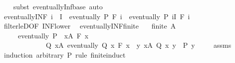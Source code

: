 \begin{isabellebody}
%
\isadelimproof
\ \ %
\endisadelimproof
%
\isatagproof
{}\isamarkupfalse%
\ {\isacharparenleft}{\kern0pt}subst\ eventually{\isacharunderscore}{\kern0pt}Inf{\isacharunderscore}{\kern0pt}base{\isacharparenright}{\kern0pt}\ auto%
\endisatagproof
{\isafoldproof}%
%
\isadelimproof
\isanewline
%
\endisadelimproof
\isanewline
{}\isamarkupfalse%
\ eventually{\isacharunderscore}{\kern0pt}INF{}{\isacharcolon}{\kern0pt}\ {\isachardoublequoteopen}i\ {\isasymin}\ I\ {\isasymLongrightarrow}\ eventually\ P\ {\isacharparenleft}{\kern0pt}F\ i{\isacharparenright}{\kern0pt}\ {\isasymLongrightarrow}\ eventually\ P\ {\isacharparenleft}{\kern0pt}{\isasymSqinter}i{\isasymin}I{\isachardot}{\kern0pt}\ F\ i{\isacharparenright}{\kern0pt}{\isachardoublequoteclose}\isanewline
%
\isadelimproof
\ \ %
\endisadelimproof
%
\isatagproof
{}\isamarkupfalse%
\ filter{\isacharunderscore}{\kern0pt}leD{\isacharbrackleft}{\kern0pt}OF\ INF{\isacharunderscore}{\kern0pt}lower{\isacharbrackright}{\kern0pt}\ \isacommand{{\isachardot}{\kern0pt}}\isamarkupfalse%
%
\endisatagproof
{\isafoldproof}%
%
\isadelimproof
\isanewline
%
\endisadelimproof
\isanewline
{}\isamarkupfalse%
\ eventually{\isacharunderscore}{\kern0pt}INF{\isacharunderscore}{\kern0pt}finite{\isacharcolon}{\kern0pt}\isanewline
\ \ \ {\isachardoublequoteopen}finite\ A{\isachardoublequoteclose}\isanewline
\ \ \ \ \ {\isachardoublequoteopen}eventually\ P\ {\isacharparenleft}{\kern0pt}{\isasymSqinter}\ x{\isasymin}A{\isachardot}{\kern0pt}\ F\ x{\isacharparenright}{\kern0pt}\ {\isasymlongleftrightarrow}\isanewline
\ \ \ \ \ \ \ \ \ \ \ \ \ {\isacharparenleft}{\kern0pt}{\isasymexists}Q{\isachardot}{\kern0pt}\ {\isacharparenleft}{\kern0pt}{\isasymforall}x{\isasymin}A{\isachardot}{\kern0pt}\ eventually\ {\isacharparenleft}{\kern0pt}Q\ x{\isacharparenright}{\kern0pt}\ {\isacharparenleft}{\kern0pt}F\ x{\isacharparenright}{\kern0pt}{\isacharparenright}{\kern0pt}\ {\isasymand}\ {\isacharparenleft}{\kern0pt}{\isasymforall}y{\isachardot}{\kern0pt}\ {\isacharparenleft}{\kern0pt}{\isasymforall}x{\isasymin}A{\isachardot}{\kern0pt}\ Q\ x\ y{\isacharparenright}{\kern0pt}\ {\isasymlongrightarrow}\ P\ y{\isacharparenright}{\kern0pt}{\isacharparenright}{\kern0pt}{\isachardoublequoteclose}\ \isanewline
%
\isadelimproof
\ \ %
\endisadelimproof
%
\isatagproof
{}\isamarkupfalse%
\ assms\isanewline
{}\isamarkupfalse%
\ {\isacharparenleft}{\kern0pt}induction\ arbitrary{\isacharcolon}{\kern0pt}\ P\ rule{\isacharcolon}{\kern0pt}\ finite{\isacharunderscore}{\kern0pt}induct{\isacharparenright}{\kern0pt}\isanewline

\end{isabellebody}
